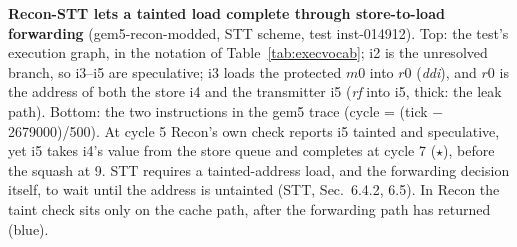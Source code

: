 \textbf{Recon-STT lets a tainted load complete through store-to-load forwarding} (gem5-recon-modded, STT scheme, test inst-014912). Top: the test's execution graph, in the notation of Table~\ref{tab:execvocab}; i2 is the unresolved branch, so i3--i5 are speculative; i3 loads the protected $m0$ into $r0$ (\textit{ddi}), and $r0$ is the address of both the store i4 and the transmitter i5 (\textit{rf} into i5, thick: the leak path). Bottom: the two instructions in the gem5 trace (cycle = (tick $-$ 2679000)/500). At cycle 5 Recon's own check reports i5 tainted and speculative, yet i5 takes i4's value from the store queue and completes at cycle 7 ($\star$), before the squash at 9. STT requires a tainted-address load, and the forwarding decision itself, to wait until the address is untainted (STT, Sec.~6.4.2, 6.5). In Recon the taint check sits only on the cache path, after the forwarding path has returned (blue).
